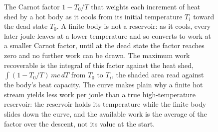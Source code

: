 \begin{figure}[htbp]
\centering
{}
\caption[Available work from a finite hot body cooling to ambient]{The Carnot
factor $1 - T_0/T$ that weights each increment of heat shed by a hot body as it
cools from its initial temperature $T_i$ toward the dead state $T_0$. A finite
body is not a reservoir: as it cools, every later joule leaves at a lower
temperature and so converts to work at a smaller Carnot factor, until at the dead
state the factor reaches zero and no further work can be drawn. The maximum work
recoverable is the integral of this factor against the heat shed, $\int (1 -
T_0/T)\,mc\,dT$ from $T_0$ to $T_i$, the shaded area read against the body's heat
capacity. The curve makes plain why a finite hot stream yields less work per joule
than a true high-temperature reservoir: the reservoir holds its temperature while
the finite body slides down the curve, and the available work is the average of
the factor over the descent, not its value at the start.}
\label{fig:vol04ch04:finite-reservoir-exergy}
\end{figure}
